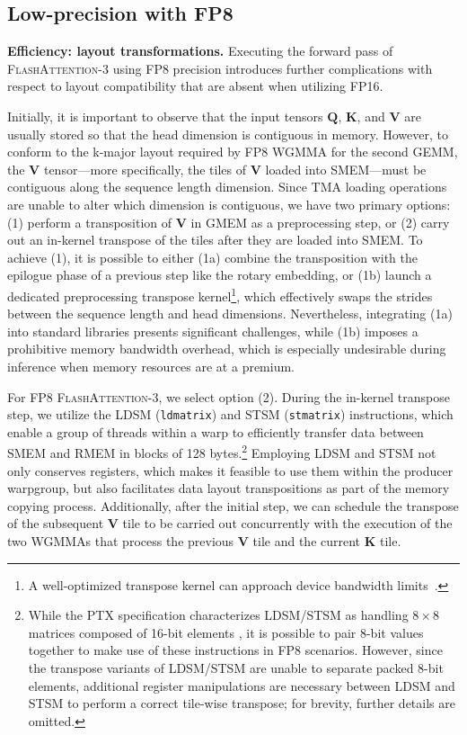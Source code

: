 \subsection{Low-precision with FP8}
\label{sec:algofp8}

\textbf{Efficiency: layout transformations.} Executing the forward pass of \textsc{FlashAttention-3} using FP8 precision introduces further complications with respect to layout compatibility that are absent when utilizing FP16.

Initially, it is important to observe that the input tensors $\mathbf{Q}$, $\mathbf{K}$, and $\mathbf{V}$ are usually stored so that the head dimension is contiguous in memory. However, to conform to the k-major layout required by FP8 WGMMA for the second GEMM, the $\mathbf{V}$ tensor—more specifically, the tiles of $\mathbf{V}$ loaded into SMEM—must be contiguous along the sequence length dimension. Since TMA loading operations are unable to alter which dimension is contiguous, we have two primary options: (1) perform a transposition of $\mathbf{V}$ in GMEM as a preprocessing step, or (2) carry out an in-kernel transpose of the tiles after they are loaded into SMEM. To achieve (1), it is possible to either (1a) combine the transposition with the epilogue phase of a previous step like the rotary embedding, or (1b) launch a dedicated preprocessing transpose kernel\footnote{A well-optimized transpose kernel can approach device bandwidth limits~\citep{colfax_cutlass_transpose_2024}.}, which effectively swaps the strides between the sequence length and head dimensions. Nevertheless, integrating (1a) into standard libraries presents significant challenges, while (1b) imposes a prohibitive memory bandwidth overhead, which is especially undesirable during inference when memory resources are at a premium.

For FP8 \textsc{FlashAttention-3}, we select option (2). During the in-kernel transpose step, we utilize the LDSM (\verb|ldmatrix|) and STSM (\verb|stmatrix|) instructions, which enable a group of threads within a warp to efficiently transfer data between SMEM and RMEM in blocks of 128 bytes.\footnote{While the PTX specification characterizes LDSM/STSM as handling $8 \times 8$ matrices composed of 16-bit elements \cite[\S 9.7.13.4.15-16]{ptx}, it is possible to pair 8-bit values together to make use of these instructions in FP8 scenarios. However, since the transpose variants of LDSM/STSM are unable to separate packed 8-bit elements, additional register manipulations are necessary between LDSM and STSM to perform a correct tile-wise transpose; for brevity, further details are omitted.} Employing LDSM and STSM not only conserves registers, which makes it feasible to use them within the producer warpgroup, but also facilitates data layout transpositions as part of the memory copying process. Additionally, after the initial step, we can schedule the transpose of the subsequent $\mathbf{V}$ tile to be carried out concurrently with the execution of the two WGMMAs that process the previous $\mathbf{V}$ tile and the current $\mathbf{K}$ tile.

